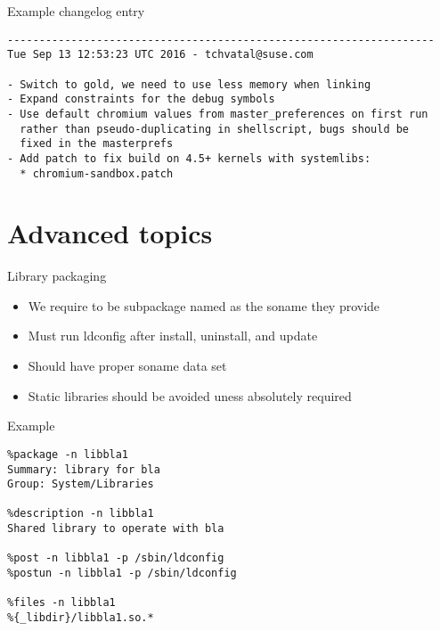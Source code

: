 \documentclass{beamer}
\begin{document}
\begin{frame}[fragile]{Example changelog entry}
	\begin{tiny}
	\begin{verbatim}
-------------------------------------------------------------------
Tue Sep 13 12:53:23 UTC 2016 - tchvatal@suse.com

- Switch to gold, we need to use less memory when linking
- Expand constraints for the debug symbols
- Use default chromium values from master_preferences on first run
  rather than pseudo-duplicating in shellscript, bugs should be
  fixed in the masterprefs
- Add patch to fix build on 4.5+ kernels with systemlibs:
  * chromium-sandbox.patch

	\end{verbatim}
	\end{tiny}
\end{frame}


\section{Advanced topics}

\begin{frame}[t]{Library packaging}
	\begin{itemize}
	\item We require to be subpackage named as the soname they provide
    \item Must run ldconfig after install, uninstall, and update
    \item Should have proper soname data set
    \item Static libraries should be avoided uness absolutely required
	\end{itemize}
\end{frame}

\begin{frame}[fragile]{Example}
	\begin{small}
	\begin{verbatim}
%package -n libbla1
Summary: library for bla
Group: System/Libraries

%description -n libbla1
Shared library to operate with bla

%post -n libbla1 -p /sbin/ldconfig
%postun -n libbla1 -p /sbin/ldconfig

%files -n libbla1
%{_libdir}/libbla1.so.*
	\end{verbatim}
	\end{small}
\end{frame}
\end{document}
